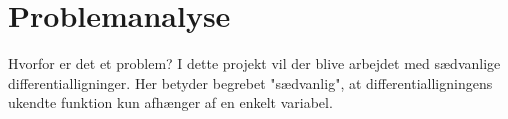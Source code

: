 \section{Problemanalyse}
Hvorfor er det et problem?
I dette projekt vil der blive arbejdet med sædvanlige differentialligninger. Her betyder begrebet "sædvanlig", at differentialligningens ukendte funktion kun afhænger af en enkelt variabel.

